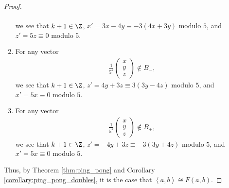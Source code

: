 \begin{proof}
\begin{enumerate}[(1)]
\begin{align*}
      \end{align*}
      we see that $k+1\in \Z$, $x' = 3x - 4y\equiv -3\left(4x + 3y\right)$ modulo $5$, and $z' = 5z \equiv 0$ modulo $5$.
    \item For any vector
      \begin{align*}
        \frac{1}{5^{k}} \begin{pmatrix}x\\y\\z\end{pmatrix}\notin B_{-},
      \end{align*}
      we see that $k+1\in \Z$, $z' = 4y + 3z \equiv 3\left(3y-4z\right)$ modulo $5$, and $x' = 5x\equiv 0$ modulo $5$.
    \item For any vector
      \begin{align*}
        \frac{1}{5^{k}} \begin{pmatrix}x\\y\\z\end{pmatrix}\notin B_{+},
      \end{align*}
      we see that $k+1\in \Z$, $z' = -4y + 3z \equiv -3\left(3y + 4z\right)$ modulo $5$, and $x' = 5x \equiv 0$ modulo $5$.
  \end{enumerate}
  Thus, by Theorem \ref{thm:ping_pong} and Corollary \ref{corollary:ping_pong_doubles}, it is the case that $\left\langle a,b \right\rangle\cong F(a,b)$.
\end{proof}

